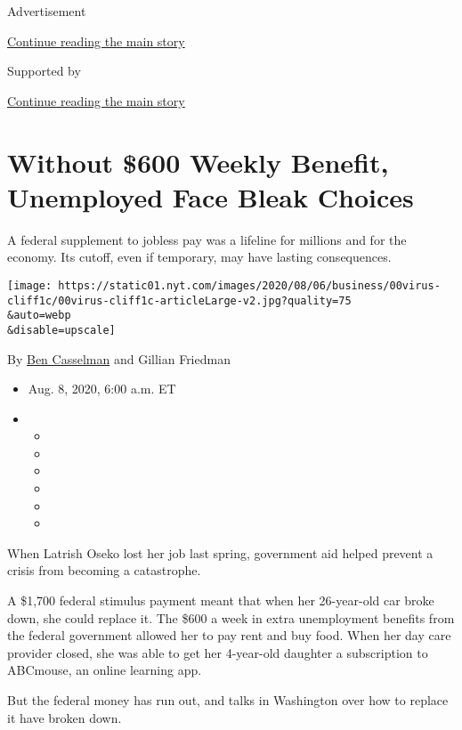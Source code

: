 Advertisement

\protect\hyperlink{after-top}{Continue reading the main story}

Supported by

\protect\hyperlink{after-sponsor}{Continue reading the main story}

\hypertarget{without-600-weekly-benefit-unemployed-face-bleak-choices}{%
\section{Without \$600 Weekly Benefit, Unemployed Face Bleak
Choices}\label{without-600-weekly-benefit-unemployed-face-bleak-choices}}

A federal supplement to jobless pay was a lifeline for millions and for
the economy. Its cutoff, even if temporary, may have lasting
consequences.

\texttt{[image: https://static01.nyt.com/images/2020/08/06/business/00virus-cliff1c/00virus-cliff1c-articleLarge-v2.jpg?quality=75\\\&auto=webp\\\&disable=upscale]}

By \href{https://www.nytimes.com/by/ben-casselman}{Ben Casselman} and
Gillian Friedman

\begin{itemize}
\item
  Aug. 8, 2020, 6:00 a.m. ET
\item
  \begin{itemize}
  \item
  \item
  \item
  \item
  \item
  \item
  \end{itemize}
\end{itemize}

When Latrish Oseko lost her job last spring, government aid helped
prevent a crisis from becoming a catastrophe.

A \$1,700 federal stimulus payment meant that when her 26-year-old car
broke down, she could replace it. The \$600 a week in extra unemployment
benefits from the federal government allowed her to pay rent and buy
food. When her day care provider closed, she was able to get her
4-year-old daughter a subscription to ABCmouse, an online learning app.

But the federal money has run out, and talks in Washington over how to
replace it have broken down.

